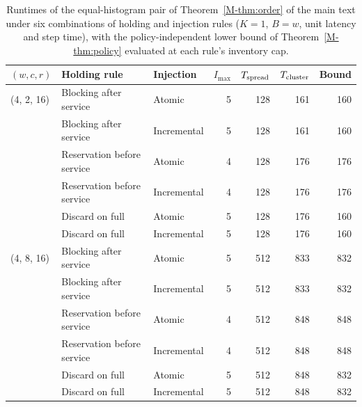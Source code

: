 \begin{table}[htbp]
\centering\footnotesize
\begin{tabular}{lllrrrr}
\toprule
$(w,c,r)$ & Holding rule & Injection & $I_{\max}$ & $T_{\rm spread}$ & $T_{\rm cluster}$ & Bound\\\midrule
(4, 2, 16) & Blocking after service & Atomic & 5 & 128 & 161 & 160\\
 & Blocking after service & Incremental & 5 & 128 & 161 & 160\\
 & Reservation before service & Atomic & 4 & 128 & 176 & 176\\
 & Reservation before service & Incremental & 4 & 128 & 176 & 176\\
 & Discard on full & Atomic & 5 & 128 & 176 & 160\\
 & Discard on full & Incremental & 5 & 128 & 176 & 160\\
(4, 8, 16) & Blocking after service & Atomic & 5 & 512 & 833 & 832\\
 & Blocking after service & Incremental & 5 & 512 & 833 & 832\\
 & Reservation before service & Atomic & 4 & 512 & 848 & 848\\
 & Reservation before service & Incremental & 4 & 512 & 848 & 848\\
 & Discard on full & Atomic & 5 & 512 & 848 & 832\\
 & Discard on full & Incremental & 5 & 512 & 848 & 832\\
\bottomrule
\end{tabular}
\caption{Runtimes of the equal-histogram pair of Theorem~\ref{M-thm:order} of the main text under six combinations of holding and injection rules ($K=1$, $B=w$, unit latency and step time), with the policy-independent lower bound of Theorem~\ref{M-thm:policy} evaluated at each rule's inventory cap.}
\label{tab:policies}
\end{table}
